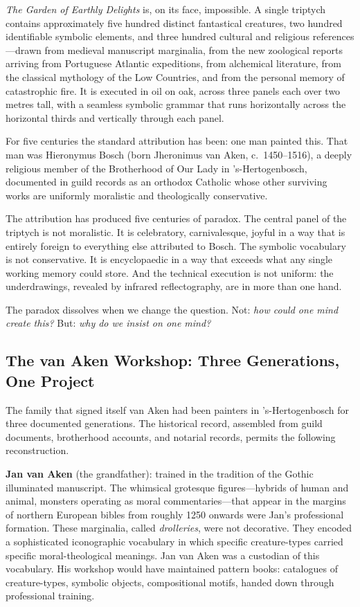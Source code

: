\textit{The Garden of Earthly Delights} is, on its face, impossible.  A
single triptych contains approximately five hundred distinct fantastical
creatures, two hundred identifiable symbolic elements, and three hundred
cultural and religious references---drawn from medieval manuscript
marginalia, from the new zoological reports arriving from Portuguese
Atlantic expeditions, from alchemical literature, from the classical
mythology of the Low Countries, and from the personal memory of
catastrophic fire.  It is executed in oil on oak, across three panels each
over two metres tall, with a seamless symbolic grammar that runs
horizontally across the horizontal thirds and vertically through each
panel.

For five centuries the standard attribution has been: one man painted this.
That man was Hieronymus Bosch (born Jheronimus van Aken, c.\ 1450--1516),
a deeply religious member of the Brotherhood of Our Lady in
's-Hertogenbosch, documented in guild records as an orthodox Catholic
whose other surviving works are uniformly moralistic and theologically
conservative.

The attribution has produced five centuries of paradox.  The central panel
of the triptych is not moralistic.  It is celebratory, carnivalesque,
joyful in a way that is entirely foreign to everything else attributed to
Bosch.  The symbolic vocabulary is not conservative.  It is encyclopaedic
in a way that exceeds what any single working memory could store.  And the
technical execution is not uniform: the underdrawings, revealed by infrared
reflectography, are in more than one hand.

The paradox dissolves when we change the question.  Not: \textit{how could
one mind create this?}  But: \textit{why do we insist on one mind?}

\bigskip

\subsection*{The van Aken Workshop: Three Generations, One Project}

The family that signed itself van Aken had been painters in
's-Hertogenbosch for three documented generations.  The historical record,
assembled from guild documents, brotherhood accounts, and notarial records,
permits the following reconstruction.

\textbf{Jan van Aken} (the grandfather): trained in the tradition of the
Gothic illuminated manuscript.  The whimsical grotesque figures---hybrids
of human and animal, monsters operating as moral commentaries---that appear
in the margins of northern European bibles from roughly 1250 onwards were
Jan's professional formation.  These marginalia, called \textit{drolleries},
were not decorative.  They encoded a sophisticated iconographic vocabulary
in which specific creature-types carried specific moral-theological
meanings.  Jan van Aken was a custodian of this vocabulary.  His workshop
would have maintained pattern books: catalogues of creature-types, symbolic
objects, compositional motifs, handed down through professional training.

